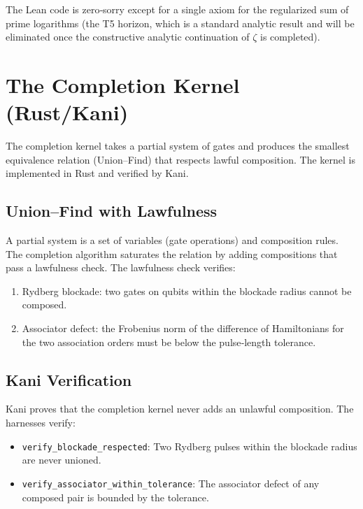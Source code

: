 \documentclass[11pt]{article}
\begin{document}
The Lean code is zero‐sorry except for a single axiom for the regularized sum of prime logarithms (the T5 horizon, which is a standard analytic result and will be eliminated once the constructive analytic continuation of \(\zeta\) is completed).

\section{The Completion Kernel (Rust/Kani)}

The completion kernel takes a partial system of gates and produces the smallest equivalence relation (Union–Find) that respects lawful composition. The kernel is implemented in Rust and verified by Kani.

\subsection{Union–Find with Lawfulness}
A partial system is a set of variables (gate operations) and composition rules. The completion algorithm saturates the relation by adding compositions that pass a lawfulness check. The lawfulness check verifies:
\begin{enumerate}
\item Rydberg blockade: two gates on qubits within the blockade radius cannot be composed.
\item Associator defect: the Frobenius norm of the difference of Hamiltonians for the two association orders must be below the pulse‐length tolerance.
\end{enumerate}

\subsection{Kani Verification}
Kani proves that the completion kernel never adds an unlawful composition. The harnesses verify:
\begin{itemize}
\item \texttt{verify\_blockade\_respected}: Two Rydberg pulses within the blockade radius are never unioned.
\item \texttt{verify\_associator\_within\_tolerance}: The associator defect of any composed pair is bounded by the tolerance.
\end{itemize}
\end{document}
